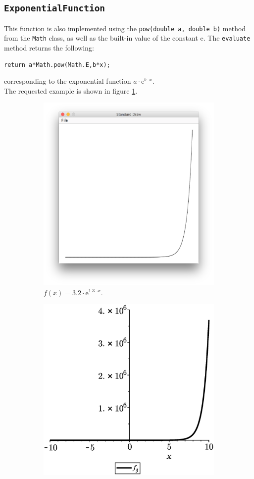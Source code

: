 \subsection{\texttt{ExponentialFunction}}
This function is also implemented using the \texttt{pow(double a, double b)} method from the \texttt{Math} class, as well as the built-in value of the constant e. The \texttt{evaluate} method returns the following:

\begin{lstlisting}
return a*Math.pow(Math.E,b*x);
\end{lstlisting}

corresponding to the exponential function $a \cdot \text{e}^{b \cdot x}$. \\
The requested example is shown in figure \ref{fig:f3}.

\begin{figure}[H]
    \begin{subfigure}{0.5\textwidth}
        \centering
        \includegraphics[width=0.7\linewidth]{GraphicalFunctionPlotter/fig/f3.png} 
        \caption{$f(x) = 3.2 \cdot \text{e}^{1.3 \cdot x}$.}
        \label{fig:f3}
    \end{subfigure}
    \begin{subfigure}{0.5\textwidth}
        \centering
        \includegraphics[width=0.7\linewidth]{GraphicalFunctionPlotter/fig/f3Check.eps}

\end{subfigure}
\end{figure}
